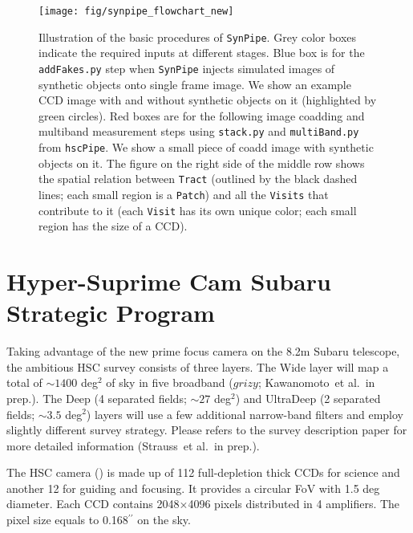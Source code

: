 \documentclass[useamsfonts]{pasj01}
\def\asec{$^{\prime\prime}$}
\def\etal{{\ et al.~}}
\def\hscpipe{\texttt{hscPipe}}
\def\synpipe{\texttt{SynPipe}}
\def\tract{\texttt{Tract}}
\def\visit{\texttt{Visit}}
\def\visits{\texttt{Visits}}
\begin{document}
\begin{figure}
    \begin{center}
        \texttt{[image: fig/synpipe\_flowchart\_new]}
    \end{center}
    \caption{
        Illustration of the basic procedures of \synpipe{}.  
        Grey color boxes indicate the required inputs at different stages. 
        Blue box is for the \texttt{addFakes.py} step when \synpipe{} injects simulated
        images of synthetic objects onto single frame image. 
        We show an example CCD image with and without synthetic objects on it 
        (highlighted by green circles).
        Red boxes are for the following image coadding and multiband measurement steps
        using \texttt{stack.py} and \texttt{multiBand.py} from \hscpipe{}. 
        We show a small piece of coadd image with synthetic objects on it.    
        The figure on the right side of the middle row shows the spatial relation 
        between \tract{} (outlined by the black dashed lines; each small region 
        is a \texttt{Patch}) and all the \visits{} that contribute to it 
        (each \visit{} has its own unique color; each small region has the size 
        of a CCD).
        }
    \label{fig:flowchart}
\end{figure}

\section{Hyper-Suprime Cam Subaru Strategic Program}
    \label{sec:ssp}
   
    Taking advantage of the new prime focus camera on the 8.2m Subaru telescope, 
    the ambitious HSC survey consists of three layers. 
    The Wide layer will map a total of ${\sim}1400$ deg$^2$ of sky in five broadband 
    ($grizy$; Kawanomoto\etal in prep.). 
    The Deep (4 separated fields; ${\sim}27$ deg$^2$) and UltraDeep (2 separated 
    fields; ${\sim}3.5$ deg$^2$) layers will use a few additional narrow-band filters 
    and employ slightly different survey strategy. 
    Please refers to the survey description paper for more detailed information
    (Strauss\etal in prep.). 
   
    The HSC camera (\citealt{Miyazaki2012}) is made up of 112 full-depletion thick CCDs 
    for science and another 12 for guiding and focusing. 
    It provides a circular FoV with 1.5 deg diameter. 
    Each CCD contains 2048$\times$4096 pixels distributed in 4 amplifiers. 
    The pixel size equals to 0.168\asec{} on the sky. 
   
\end{document}
